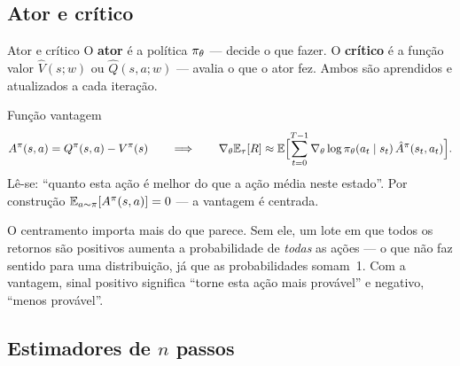 \documentclass[11pt]{article}
\newcommand{\thv}{\theta}
\newcommand{\wv}{w}
\newcommand{\polth}{\pol_{\thv}}
\newcommand{\gth}{\nabla_{\thv}}
\newcommand{\traj}{\tau}
\newcommand{\Vhat}{\hat{V}}
\newcommand{\Qhat}{\hat{Q}}
\newcommand{\Ahat}{\hat{A}}
\newcommand{\Advpi}{A^{\pol}}
\begin{document}
\subsection{Ator e crítico}

\begin{defbox}{Ator e crítico}
O \textbf{ator} é a política $\polth$ --- decide o que fazer. O \textbf{crítico}
é a função valor $\Vhat(s;\wv)$ ou $\Qhat(s,a;\wv)$ --- avalia o que o ator fez.
Ambos são aprendidos e atualizados a cada iteração.
\end{defbox}

\begin{center}
\end{center}

\begin{defbox}{Função vantagem}
\[
  \Advpi(s,a) = \Qpi(s,a) - \Vpi(s)
  \qquad\Longrightarrow\qquad
  \gth\E_{\traj}[R] \approx \E\Bigl[\sum_{t=0}^{T-1}
    \gth\log\polth(a_t\mid s_t)\,\Ahat^{\pol}(s_t,a_t)\Bigr].
\]
Lê-se: ``quanto esta ação é melhor do que a ação média neste estado''. Por
construção $\E_{a\sim\pol}[\Advpi(s,a)]=0$ --- a vantagem é centrada.
\end{defbox}

O centramento importa mais do que parece. Sem ele, um lote em que todos os
retornos são positivos aumenta a probabilidade de \emph{todas} as ações --- o que
não faz sentido para uma distribuição, já que as probabilidades somam~1. Com a
vantagem, sinal positivo significa ``torne esta ação mais provável'' e negativo,
``menos provável''.

\subsection{Estimadores de \texorpdfstring{$n$}{n} passos}
\end{document}
